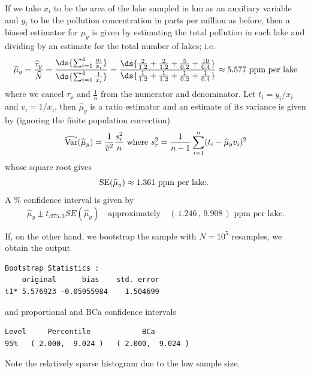 \documentclass{homework}
\begin{document}
\begin{solution}
If we take $x_i$ to be the area of the lake sampled in \unit{km} as an auxiliary variable and $y_i$ to be the pollution concentration in parts per million as before, then a biased estimator for $\mu_y$ is given by estimating the total pollution in each lake and dividing by an estimate for the total number of lakes; i.e.
$$
  \hat \mu_y = \frac{\hat \tau_y}{\hat N} = \frac{\ds{\sum_{i=1}^4\frac{y_i}{x_i}}}{\ds{\sum_{i=1}^4\frac{1}{x_i}}} = \frac{\ds{\frac{2}{1.2} +\frac{2}{1.2} +\frac{5}{0.2} + \frac{10}{0.4}}}{\ds{\frac{1}{1.2} +\frac{1}{1.2} +\frac{1}{0.2} + \frac{1}{0.4}}}\approx  5.577\text{ ppm per lake}
$$ 
where we cancel $\tau_x$ and $\frac 1n$ from the numerator and denominator. Let $t_i = y_i/x_i$ and $v_i = 1/x_i$, then $\hat \mu_y$ is a ratio estimator and an estimate of its variance is given by (ignoring the finite population correction)
$$
  \widehat{\mathrm{Var}}(\widehat \mu_y) = \frac{1}{\overline v^2} \frac{s_r^2}{n}\text{ where }s_r^2 = \frac{1}{n-1}\sum_{i=1}^n(t_i - \widehat \mu_y v_i)^2
$$
whose square root gives
$$
  \mathrm{SE}(\widehat \mu_y) \approx 1.361\text{ ppm per lake. }
$$
A \unit[95]{\%} confidence interval is given by
$$
  \hat\mu_y \pm t_{.975,3} SE(\hat \mu_y)\quad\text{approximately} \quad (\,1.246\,,\, 9.908\,)\text{ ppm per lake.}
$$
\begin{minipage}{.5\textwidth}
If, on the other hand, we bootstrap the sample with $N=10^5$ resamples, we obtain the output
{\footnotesize
\begin{verbatim}
Bootstrap Statistics :
    original      bias    std. error
t1* 5.576923 -0.05955984    1.504699
\end{verbatim}
}
and proportional and BCa confidence intervals
{\footnotesize
\begin{verbatim}
Level     Percentile            BCa          
95%   ( 2.000,  9.024 )   ( 2.000,  9.024 )  
\end{verbatim}
}
Note the relatively sparse histogram due to the low sample size.
\end{minipage}
\begin{minipage}{.48\textwidth}

\end{minipage}
\end{solution}
\end{document}
